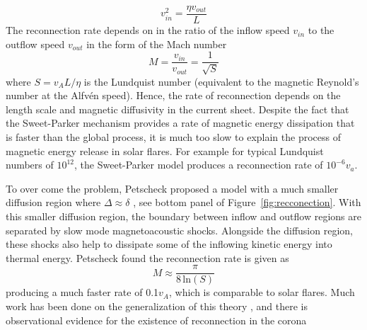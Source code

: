 \begin{equation}
v_{in}^2 = \frac{\eta v_{out}}{L}
\end{equation}
The reconnection rate depends on in the ratio of the inflow speed $v_{in}$ to the outflow speed $v_{out}$ in the form of the Mach number
\begin{equation}
M = \frac{v_{in}}{v_{out}} = \frac{1}{\sqrt{S}}
\end{equation}
where $S=v_AL/\eta$ is the Lundquist number (equivalent to the magnetic Reynold's number at the Alfv\'{e}n speed). Hence, the rate of reconnection depends on the length scale and magnetic diffusivity in the current sheet. Despite the fact that the Sweet-Parker mechanism provides a rate of magnetic energy dissipation that is faster than the global process, it is much too slow to explain the process of magnetic energy release in solar flares. For example for typical Lundquist numbers of $10^{12}$, the Sweet-Parker model produces a reconnection rate of $10^{-6}v_a$.

To over come the problem, Petscheck proposed a model with a much smaller diffusion region where $\Delta\approx\delta$ \citep{petschek1964}, see bottom panel of Figure~\ref{fig:recconection}. With this smaller diffusion region, the boundary between inflow and outflow regions are separated by slow mode magnetoacoustic shocks. Alongside the diffusion region, these shocks also help to dissipate some of the inflowing kinetic energy into thermal energy. Petscheck found the reconnection rate is given as
\begin{equation}
M \approx \frac{\pi}{8\,\mathrm{ln}(S)}
\end{equation}
producing a much faster rate of 0.1$v_A$, which is comparable to solar flares. Much work has been done on the generalization of this theory \citep{priest1986, sonnerup1970}, and there is observational evidence for the existence of reconnection in the corona \citep{su2013}

